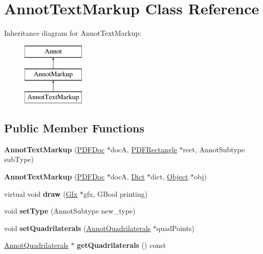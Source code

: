 \hypertarget{class_annot_text_markup}{}\section{Annot\+Text\+Markup Class Reference}
\label{class_annot_text_markup}
Inheritance diagram for Annot\+Text\+Markup\+:\begin{figure}[H]
\begin{center}
\leavevmode
\includegraphics[height=3.000000cm]{class_annot_text_markup}
\end{center}
\end{figure}
\subsection*{Public Member Functions}
\begin{DoxyCompactItemize}
\item 
\mbox{\label{class_annot_text_markup_a908c141082174ba8a54f85d1d853298b}} 
{\bfseries Annot\+Text\+Markup} (\hyperlink{class_p_d_f_doc}{P\+D\+F\+Doc} $\ast$docA, \hyperlink{class_p_d_f_rectangle}{P\+D\+F\+Rectangle} $\ast$rect, Annot\+Subtype sub\+Type)
\item 
\mbox{\label{class_annot_text_markup_a2cdf3bf12a93db1d9b260ad8c33d04b6}} 
{\bfseries Annot\+Text\+Markup} (\hyperlink{class_p_d_f_doc}{P\+D\+F\+Doc} $\ast$docA, \hyperlink{class_dict}{Dict} $\ast$dict, \hyperlink{class_object}{Object} $\ast$obj)
\item 
\mbox{\label{class_annot_text_markup_a1eef8c4c1a8a3128b8833af2ef3a0f57}} 
virtual void {\bfseries draw} (\hyperlink{class_gfx}{Gfx} $\ast$gfx, G\+Bool printing)
\item 
\mbox{\label{class_annot_text_markup_ab3b8a409ef655a799760ca81b0807f16}} 
void {\bfseries set\+Type} (Annot\+Subtype new\+\_\+type)
\item 
\mbox{\label{class_annot_text_markup_a6ef9cd48a984f6d1facd9069536d00de}} 
void {\bfseries set\+Quadrilaterals} (\hyperlink{class_annot_quadrilaterals}{Annot\+Quadrilaterals} $\ast$quad\+Points)
\item 
\mbox{\label{class_annot_text_markup_ad7aee1d36c99bba39ebc9373cb949084}} 
\hyperlink{class_annot_quadrilaterals}{Annot\+Quadrilaterals} $\ast$ {\bfseries get\+Quadrilaterals} () const
\end{DoxyCompactItemize}
